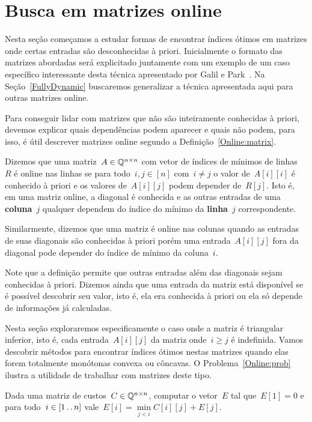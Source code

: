 \section{Busca em matrizes online}
\label{Online}

Nesta seção começamos a estudar formas de encontrar índices ótimos em matrizes onde certas entradas são desconhecidas à priori. Inicialmente o formato das matrizes abordadas será explicitado juntamente com um exemplo de um caso específico interessante desta técnica apresentado por Galil e Park~\cite{Galil:1992}. Na Seção~\ref{FullyDynamic} buscaremos generalizar a técnica apresentada aqui para outras matrizes online.

Para conseguir lidar com matrizes que não são inteiramente conhecidas à priori, devemos explicar quais dependências podem aparecer e quais não podem, para isso, é útil descrever matrizes online segundo a Definição~\ref{Online:matrix}.

\begin{defi} \label{Online:matrix}
Dizemos que uma matriz~$A \in \mathbb{Q}^{n \times n}$ com vetor de índices de mínimos de linhas~$R$ é online nas linhas se para todo~$i,j \in [n]$ com~$i \neq j$ o valor de~$A[i][i]$ é conhecido à priori e os valores de~$A[i][j]$ podem depender de~$R[j]$. Isto é, em uma matriz online, a diagonal é conhecida e as outras entradas de uma \textbf{coluna}~$j$ qualquer dependem do índice do mínimo da \textbf{linha}~$j$ correspondente.

Similarmente, dizemos que uma matriz é online nas colunas quando as entradas de suas diagonais são conhecidas à priori porém uma entrada~$A[i][j]$ fora da diagonal pode depender do índice de mínimo da coluna~$i$.
\end{defi}

Note que a definição permite que outras entradas além das diagonais sejam conhecidas à priori. Dizemos ainda que uma entrada da matriz está disponível se é possível descobrir seu valor, isto é, ela era conhecida à priori ou ela só depende de informações já calculadas.

Nesta seção exploraremos especificamente o caso onde a matriz é triangular inferior, isto é, cada entrada~$A[i][j]$ da matriz onde~$i \geq j$ é indefinida. Vamos descobrir métodos para encontrar índices ótimos nestas matrizes quando elas forem totalmente monótonas convexa ou côncavas. O Problema~\ref{Online:prob} ilustra a utilidade de trabalhar com matrizes deste tipo.

\begin{prob} \label{Online:prob}
Dada uma matriz de custos~$C \in \mathbb{Q}^{n \times n}$, computar o vetor~$E$ tal que~$E[1] = 0$ e para todo~$i \in [1 \,.\,.\, n]$ vale~$E[i] = \min\limits_{j < i} C[i][j] + E[j]$.
\end{prob}

